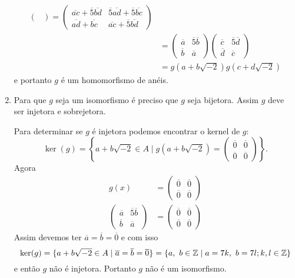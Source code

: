 \documentclass[12pt]{exam}
\begin{document}
\begin{enumerate}[label=({\alph*})]
\begin{align*}
\begin{pmatrix}
            \end{pmatrix} = \begin{pmatrix}
            \overline{ac} + \overline{5}\overline{bd} & \overline{5}\overline{ad} + \overline{5}\overline{bc}\\\overline{ad} + \overline{bc} & \overline{ac} + \overline{5}\overline{bd}
            \end{pmatrix} \\ &= \begin{pmatrix}
            \overline{a} & \overline{5}\overline{b}\\\overline{b} & \overline{a}
            \end{pmatrix} \begin{pmatrix}
            \overline{c} & \overline{5}\overline{d}\\\overline{d} & \overline{c}
            \end{pmatrix} \\ &= g(a + b\sqrt{-2})g(c + d\sqrt{-2})
        \end{align*}
        e portanto $g$ é um homomorfismo de anéis.

         \item Para que $g$ seja um isomorfismo é preciso que $g$ seja bijetora. Assim $g$ deve ser injetora e sobrejetora.

        Para determinar se $g$ é injetora podemos encontrar o kernel de $g$:
        \[
            \ker(g) = \left\{a + b\sqrt{-2} \in A \mid g(a + b\sqrt{-2}) = \begin{pmatrix}
            \overline{0} & \overline{0}\\\overline{0} & \overline{0}
        \end{pmatrix}\right\}.
        \]
        Agora
        \begin{align*}
            g(x) &= \begin{pmatrix}\overline{0} & \overline{0}\\\overline{0} & \overline{0}\end{pmatrix}\\
            \begin{pmatrix}\overline{a} & \overline{5}\overline{b}\\\overline{b} & \overline{a}
            \end{pmatrix} &= \begin{pmatrix}\overline{0} & \overline{0}\\\overline{0} & \overline{0}\end{pmatrix}
        \end{align*}
        Assim devemos ter $\overline{a} = \overline{b} = \overline{0}$ e com isso
        \[
            \ker(g) = \{a + b\sqrt{-2} \in A \mid \overline{a} = \overline{b} = \overline{0}\} = \{a,\ b \in \mathbb{Z} \mid a = 7k,\ b = 7l; k,l \in \mathbb{Z}\}
        \]
        e então $g$ não é injetora. Portanto $g$ não é um isomorfismo.
    \end{enumerate}
    \vspace{1cm}
\end{document}
